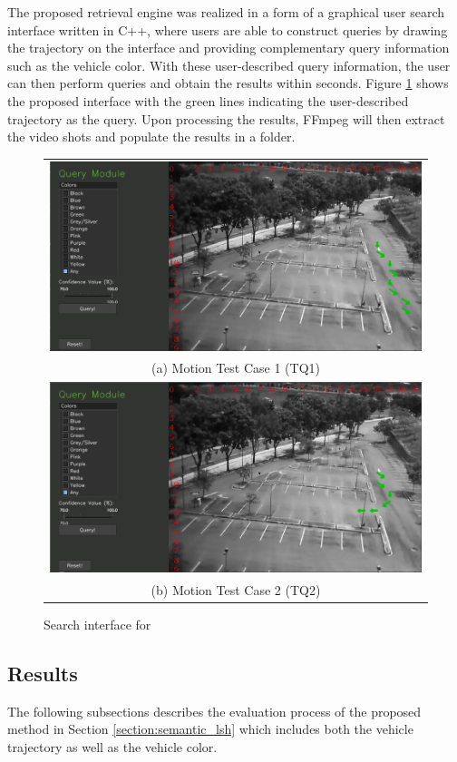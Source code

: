 The proposed retrieval engine was realized in a form of a graphical user search interface written in C++, where users are able to construct queries by drawing the trajectory on the interface and providing complementary query information such as the vehicle color. With these user-described query information, the user can then perform queries and obtain the results within seconds. Figure \ref{fig:versionOneInterface} shows the proposed interface with the green lines indicating the user-described trajectory as the query. Upon processing the results, FFmpeg will then extract the video shots and populate the results in a folder.





\begin{figure}[htb!]
	\centering
	\begin{tabular}{c}
		\includegraphics[width=0.7\linewidth]{image/retrievalOne/test1-8inputs.PNG} \\  
		(a) Motion Test Case 1 (TQ1) \\
		\includegraphics[width=0.7\linewidth]{image/retrievalOne/test2-6input.PNG}\\
		(b) Motion Test Case 2 (TQ2)
	\end{tabular}
	\caption{Search interface for \versionOne} 
	\label{fig:versionOneInterface}
\end{figure}




\subsection{Results}
The following subsections describes the evaluation process of the proposed method in Section \ref{section:semantic_lsh} which includes both the vehicle trajectory as well as the vehicle color. 

